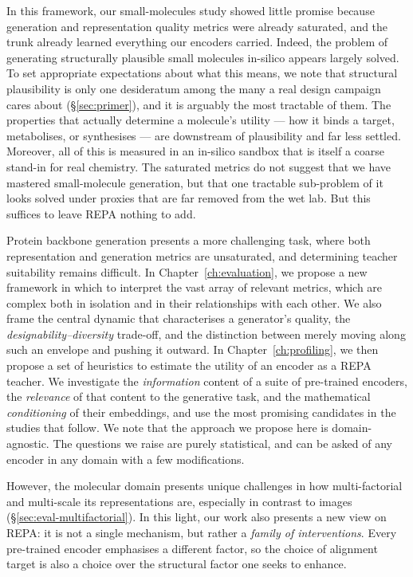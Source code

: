 \documentclass[12pt,a4paper,twoside]{report}
\begin{document}
In this framework, our small-molecules study showed little promise because generation and representation quality metrics were already saturated, and the trunk already learned everything our encoders carried. Indeed, the problem of generating structurally plausible small molecules in-silico appears largely solved. To set appropriate expectations about what this means, we note that structural plausibility is only one desideratum among the many a real design campaign cares about (\S\ref{sec:primer}), and it is arguably the most tractable of them. The properties that actually determine a molecule's utility --- how it binds a target, metabolises, or synthesises --- are downstream of plausibility and far less settled. Moreover, all of this is measured in an in-silico sandbox that is itself a coarse stand-in for real chemistry. The saturated metrics do not suggest that we have mastered small-molecule generation, but that one tractable sub-problem of it looks solved under proxies that are far removed from the wet lab. But this suffices to leave REPA nothing to add.

Protein backbone generation presents a more challenging task, where both representation and generation metrics are unsaturated, and determining teacher suitability remains difficult. In Chapter~\ref{ch:evaluation}, we propose a new framework in which to interpret the vast array of relevant metrics, which are complex both in isolation and in their relationships with each other. We also frame the central dynamic that characterises a generator's quality, the \emph{designability--diversity} trade-off, and the distinction between merely moving along such an envelope and pushing it outward. In Chapter~\ref{ch:profiling}, we then propose a set of heuristics to estimate the utility of an encoder as a REPA teacher. We investigate the \emph{information} content of a suite of pre-trained encoders, the \emph{relevance} of that content to the generative task, and the mathematical \emph{conditioning} of their embeddings, and use the most promising candidates in the studies that follow. We note that the approach we propose here is domain-agnostic. The questions we raise are purely statistical, and can be asked of any encoder in any domain with a few modifications.

However, the molecular domain presents unique challenges in how multi-factorial and multi-scale its representations are, especially in contrast to images (\S\ref{sec:eval-multifactorial}). In this light, our work also presents a new view on REPA: it is not a single mechanism, but rather a \emph{family of interventions}. Every pre-trained encoder emphasises a different factor, so the choice of alignment target is also a choice over the structural factor one seeks to enhance.
\end{document}

